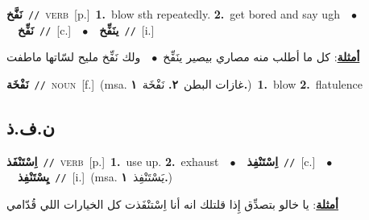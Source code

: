 \documentclass[10pt,a4paper,twoside]{article} %
\begin{document}
\begin{multicols}{2}
{\setlength\topsep{0pt}\textbf{\foreignlanguage{arabic}{نَفَّخ}}\ {\color{gray}\texttt{//}\color{black}}\ \textsc{verb}\ [p.]\ \textbf{1.}~blow sth repeatedly.  \textbf{2.}~get bored and say ugh\ \ $\bullet$\ \ \setlength\topsep{0pt}\textbf{\foreignlanguage{arabic}{نَفِّخ}}\ {\color{gray}\texttt{//}\color{black}}\ [c.]\ \ $\bullet$\ \ \setlength\topsep{0pt}\textbf{\foreignlanguage{arabic}{ينَفِّخ}}\ {\color{gray}\texttt{//}\color{black}}\ [i.]\  \begin{flushright}\color{gray}\foreignlanguage{arabic}{\textbf{\underline{\foreignlanguage{arabic}{أمثلة}}}: كل ما أطلب منه مصاري بيصير ينَفِّخ\ $\bullet$\ \  ولك نَفِّخ مليح لسّاتها ماطفت}\end{flushright}\color{black}} \vspace{2mm}

{\setlength\topsep{0pt}\textbf{\foreignlanguage{arabic}{نَفْخَة}}\ {\color{gray}\texttt{//}\color{black}}\ \textsc{noun}\ [f.]\ \color{gray}(msa. \foreignlanguage{arabic}{غازات البطن}~\foreignlanguage{arabic}{\textbf{٢.}}  \foreignlanguage{arabic}{نَفْخَة}~\foreignlanguage{arabic}{\textbf{١.}})\color{black}\ \textbf{1.}~blow  \textbf{2.}~flatulence\ } \vspace{2mm}

\vspace{-3mm}
\subsection*{\color{blue}\foreignlanguage{arabic}{ن.ف.ذ}\color{blue}{}} 

{\setlength\topsep{0pt}\textbf{\foreignlanguage{arabic}{اِسْتَنْفَذ}}\ {\color{gray}\texttt{//}\color{black}}\ \textsc{verb}\ [p.]\ \textbf{1.}~use up.  \textbf{2.}~exhaust\ \ $\bullet$\ \ \setlength\topsep{0pt}\textbf{\foreignlanguage{arabic}{اِسْتَنْفِذ}}\ {\color{gray}\texttt{//}\color{black}}\ [c.]\ \ $\bullet$\ \ \setlength\topsep{0pt}\textbf{\foreignlanguage{arabic}{يِسْتَنْفِذ}}\ {\color{gray}\texttt{//}\color{black}}\ [i.]\ \color{gray}(msa. \foreignlanguage{arabic}{يَسْتَنْفِذ}~\foreignlanguage{arabic}{\textbf{١.}})\color{black}\  \begin{flushright}\color{gray}\foreignlanguage{arabic}{\textbf{\underline{\foreignlanguage{arabic}{أمثلة}}}: يا خالو بتصدِّق إِذا قلتلك انه أنا اِسْتنْفَذت كل الخيارات اللي قُدّامي}\end{flushright}\color{black}} \vspace{2mm}


\end{multicols}
\end{document}
